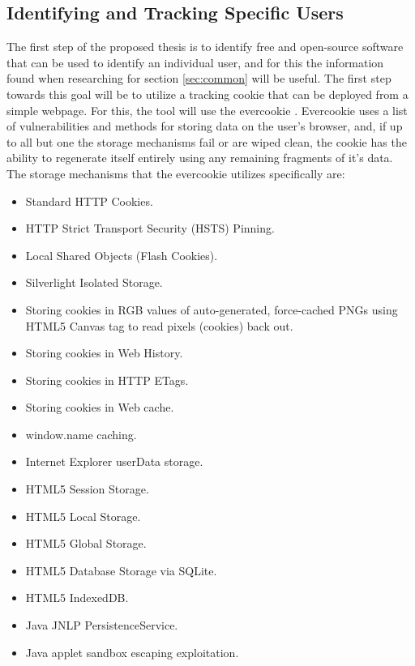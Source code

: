 \documentclass[11pt]{article}
\begin{document}
\subsection{Identifying and Tracking Specific Users} \label{sec:identifying}
The first step of the proposed thesis is to identify free and open-source software that can be used to identify an individual user, and for this the information found when researching for section \ref{sec:common} will be useful. The first step towards this goal will be to utilize a tracking cookie that can be deployed from a simple webpage. For this, the tool will use the evercookie \cite{evercookie}. Evercookie uses a list of vulnerabilities and methods for storing data on the user's browser, and, if up to all but one the storage mechanisms fail or are wiped clean, the cookie has the ability to regenerate itself entirely using any remaining fragments of it's data. The storage mechanisms that the evercookie utilizes specifically are: 
\begin{itemize}
  \item Standard HTTP Cookies.
  \item HTTP Strict Transport Security (HSTS) Pinning.
  \item Local Shared Objects (Flash Cookies).
  \item Silverlight Isolated Storage. 
  \item Storing cookies in RGB values of auto-generated, force-cached PNGs using HTML5 Canvas tag to read pixels (cookies) back out.
  \item Storing cookies in Web History. 
  \item Storing cookies in HTTP ETags. 
  \item Storing cookies in Web cache. 
  \item window.name caching.
  \item Internet Explorer userData storage.
  \item HTML5 Session Storage. 
  \item HTML5 Local Storage.
  \item HTML5 Global Storage.
  \item HTML5 Database Storage via SQLite.
  \item HTML5 IndexedDB.
  \item Java JNLP PersistenceService.
  \item Java applet sandbox escaping exploitation.
\end{itemize}
\end{document}
